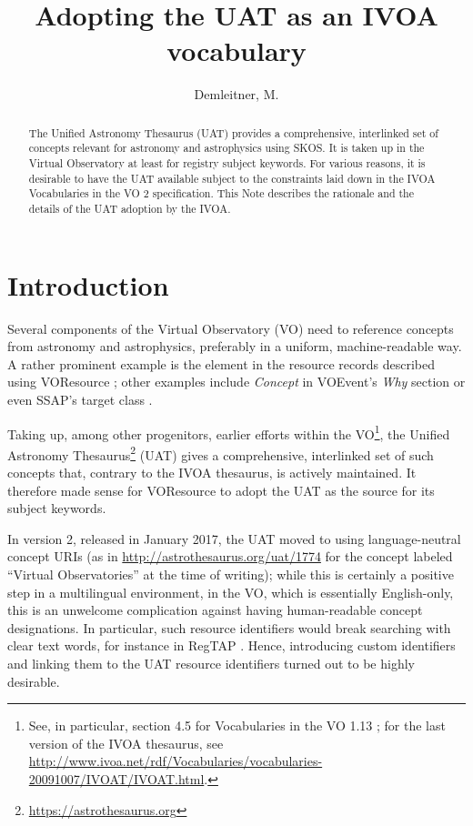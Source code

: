 \documentclass[11pt,a4paper]{ivoa}
\title{Adopting the UAT as an IVOA vocabulary}
\author[https://wiki.ivoa.net/twiki/bin/view/IVOA/MarkusDemleitner]{Demleitner, M.}
\begin{document}
\begin{abstract}
The Unified Astronomy Thesaurus (UAT) provides a comprehensive, interlinked
set of concepts relevant for astronomy and astrophysics using SKOS.  It
is taken up in the Virtual Observatory at least for registry subject
keywords.  For various reasons, it is desirable to have the UAT
available subject to the constraints laid down in the IVOA Vocabularies in
the VO 2 specification.  This Note describes the rationale and the
details of the UAT adoption by the IVOA.
\end{abstract}



\section{Introduction}

Several components of the Virtual Observatory (VO) need to reference
concepts from astronomy and astrophysics, preferably in a uniform,
machine-readable way.  A rather prominent example is the 
element in the resource records described using VOResource
\citep{2018ivoa.spec.0625P}; other examples include \emph{Concept} in
VOEvent's \emph{Why} section \citep{2011ivoa.spec.0711S} or even SSAP's
target class \citep{2012ivoa.spec.0210T}.

Taking up, among other progenitors, earlier efforts within the
VO\footnote{See, in particular, section 4.5 for Vocabularies in the VO
1.13 \citep{2009ivoa.spec.1007G}; for the last version of the IVOA
thesaurus, see
\url{http://www.ivoa.net/rdf/Vocabularies/vocabularies-20091007/IVOAT/IVOAT.html}.},
the Unified Astronomy
Thesaurus\footnote{\url{https://astrothesaurus.org}} (UAT) gives a
comprehensive, interlinked set of such concepts that, contrary to the
IVOA thesaurus, is actively maintained.  It therefore made sense for
VOResource to adopt the UAT as the source for its subject keywords.

In version 2, released in January 2017, the UAT 
moved to using language-neutral
concept URIs (as in \url{http://astrothesaurus.org/uat/1774} for the
concept labeled ``Virtual Observatories'' at the time of writing); while
this is certainly a positive step in a multilingual environment, in the
VO, which is essentially English-only, this is an unwelcome complication
against having human-readable concept designations.  In particular, such
resource identifiers would break searching with clear text words, for
instance in RegTAP \citep{2019ivoa.spec.1011D}.  Hence, introducing
custom identifiers and linking them to the UAT resource identifiers
turned out to be highly desirable.
\end{document}
